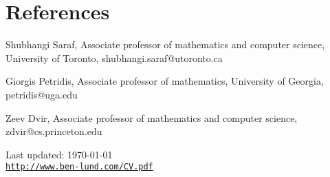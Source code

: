 \documentclass[letterpaper]{article}
\def\footerlink{http://www.ben-lund.com/CV.pdf}
\renewenvironment{itemize}{
  \begin{list}{}{
    \setlength{\leftmargin}{1.5em}
  }
}{
  \end{list}
}
\begin{document}
\section*{References}
\begin{itemize}
	\item Shubhangi Saraf, Associate professor of mathematics and computer science, University of Toronto, shubhangi.saraf@utoronto.ca
	\item Giorgis Petridis, Associate professor of mathematics, University of Georgia, petridis@uga.edu
	\item Zeev Dvir, Associate professor of mathematics and computer science, zdvir@cs.princeton.edu
\end{itemize}


\begin{comment}
\section*{Collaborators}
Imre B\'ar\'any (University College London, R\'enyi Institute), Abdul Basit (Rutgers University), Julien Bureaux (Lyc\'ee Carnot), Javier Cilleruelo, Brandon Hanson (Penn State), Alex Iosevich (University of Rochester), Alexander Magazinov (Tel Aviv University), Van Thang Pham (EPFL), Oliver Roche-Newton (JKU Linz), Misha Rudnev (University of Bristol), Shubhangi Saraf (Rutgers University), Adam Sheffer (CalTech), Le Anh Vinh (Vietnam National University), Charles Wolf (Rutgers University), Frank de Zeeuw (EPFL)
\end{comment}


\bigskip

\begin{center}
  \begin{footnotesize}
    Last updated: \today \\
    \href{\footerlink}{\texttt{\footerlink}}
  \end{footnotesize}
\end{center}
\end{document}
